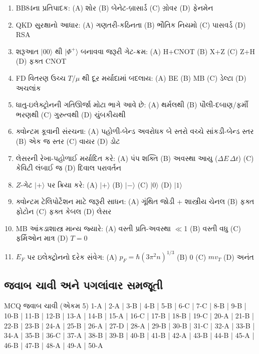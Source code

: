 \begin{enumerate}[label=\textbf{\arabic*.}]
  \item BB84ના પ્રતિપાદક: (A) શોર (B) બેનેટ-બ્રાસાર્ડ (C) ગ્રોવર (D) ફેનમેન
  \item QKD સુરક્ષાનો આધાર: (A) ગણતરી-કઠિનતા (B) ભૌતિક નિયમો (C) પાસવર્ડ (D) RSA
  \item શરૂઆત $|00\rangle$ થી $|\Phi^{+}\rangle$ બનાવવા જરૂરી ગેટ-ક્રમ: (A) H+CNOT (B) X+Z (C) Z+H (D) ફક્ત CNOT
  \item FD વિતરણ ઉચ્ચ $T$/$\mu$ થી દૂર મર્યાદામાં બદલાય: (A) BE (B) MB (C) ડેલ્ટા (D) અચલાંક
  \item ધાતુ-ઇલેક્ટ્રોનની ગતિઊર્જા મોટા ભાગે આવે છે: (A) થર્મલથી (B) પૌલી-દબાણ/ફર્મી ભરણથી (C) ગુરુત્વથી (D) ચુંબકીયથી
  \item ક્વોન્ટમ કૂવાની સંરચના: (A) પહોળી-બેન્ડ અવરોધક બે સ્તરો વચ્ચે સાંકડી-બેન્ડ સ્તર (B) એક જ સ્તર (C) વાયર (D) ડોટ
  \item લેસરની રેખા-પહોળાઈ મર્યાદિત કરે: (A) પંપ શક્તિ (B) અવસ્થા આયુ ($\Delta E\,\Delta t$) (C) કેવિટી લંબાઈ જ (D) દિવાલ પરાવર્તન
  \item $Z$-ગેટ $|+\rangle$ પર ક્રિયા કરે: (A) $|+\rangle$ (B) $|-\rangle$ (C) $|0\rangle$ (D) $|1\rangle$
  \item ક્વોન્ટમ ટેલિપોર્ટેશન માટે જરૂરી સાધન: (A) ગૂંથિત જોડી + શાસ્ત્રીય ચેનલ (B) ફક્ત ફોટોન (C) ફક્ત કેબલ (D) લેસર
  \item MB આંકડાશાસ્ત્ર માન્ય જ્યારે: (A) વસ્તી પ્રતિ-અવસ્થા $\ll$1 (B) વસ્તી વધુ (C) ફર્મિઓન માત્ર (D) $T=0$
  \item $E_F$ પર ઇલેક્ટ્રોનનો દરેક સંવેગ: (A) $p_F=\hbar(3\pi^{2}n)^{1/3}$ (B) 0 (C) $mv_T$ (D) અનંત
\end{enumerate}

\subsection*{જવાબ ચાવી અને પગલાંવાર સમજૂતી}
\begin{javabchavi}{MCQ જવાબ ચાવી (એકમ 5)}
1-A | 2-A | 3-B | 4-B | 5-B | 6-C | 7-C | 8-B | 9-B | 10-B |
11-B | 12-B | 13-A | 14-B | 15-A | 16-C | 17-B | 18-B | 19-C | 20-A |
21-B | 22-B | 23-B | 24-A | 25-B | 26-A | 27-D | 28-A | 29-B | 30-B |
31-C | 32-A | 33-B | 34-A | 35-B | 36-C | 37-A | 38-B | 39-B | 40-B |
41-B | 42-A | 43-B | 44-B | 45-A | 46-B | 47-B | 48-A | 49-A | 50-A
\end{javabchavi}

